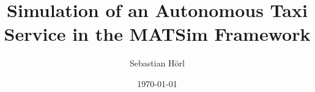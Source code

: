 \documentclass[12pt,a4paper]{article}
\title{Simulation of an Autonomous Taxi Service in the MATSim Framework}
\author{
    Sebastian Hörl
}
\date{\today}
\begin{document}
\maketitle
\pagebreak

\tableofcontents
\pagebreak

 \FloatBarrier \pagebreak
 \FloatBarrier \pagebreak
 \FloatBarrier \pagebreak
 \FloatBarrier \pagebreak
 \FloatBarrier \pagebreak
 \FloatBarrier \pagebreak
 \FloatBarrier \pagebreak


\end{document}
